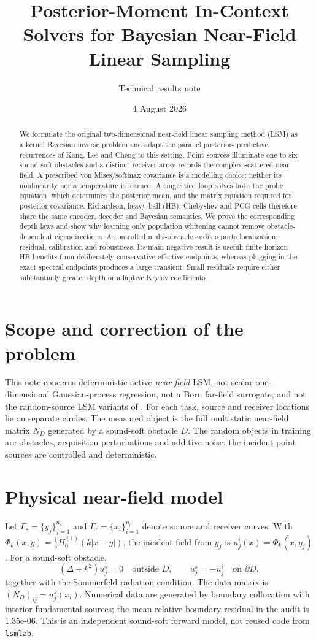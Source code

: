 \documentclass[10pt]{article}
\title{Posterior-Moment In-Context Solvers for Bayesian Near-Field Linear Sampling}
\author{Technical results note}
\date{4 August 2026}
\begin{document}
\maketitle

\begin{abstract}
We formulate the original two-dimensional near-field linear sampling method
(LSM) as a kernel Bayesian inverse problem and adapt the parallel posterior-
predictive recurrences of Kang, Lee and Cheng to this setting.  Point sources
illuminate one to six sound-soft obstacles and a distinct receiver array records
the complex scattered near field.  A prescribed von Mises/softmax covariance is
a modelling choice: neither its nonlinearity nor a temperature is learned.  A
single tied loop solves both the probe equation, which determines the posterior
mean, and the matrix equation required for posterior covariance.  Richardson,
heavy-ball (HB), Chebyshev and PCG cells therefore share the same encoder,
decoder and Bayesian semantics.  We prove the corresponding depth laws and
show why learning only population whitening cannot remove obstacle-dependent
eigendirections.  A controlled multi-obstacle audit reports localization,
residual, calibration and robustness.  Its main negative result is useful:
finite-horizon HB benefits from deliberately conservative effective endpoints,
whereas plugging in the exact spectral endpoints produces a large transient.
Small residuals require either substantially greater depth or adaptive Krylov
coefficients.
\end{abstract}

\section{Scope and correction of the problem}
This note concerns deterministic active \emph{near-field} LSM, not scalar
one-dimensional Gaussian-process regression, not a Born far-field surrogate,
and not the random-source LSM variants of \citet{montanelli2022,montanelli2024}.
For each task, source and receiver locations lie on separate circles.  The
measured object is the full multistatic near-field matrix $N_D$ generated by a
sound-soft obstacle $D$.  The random objects in training are obstacles,
acquisition perturbations and additive noise; the incident point sources are
controlled and deterministic.

\section{Physical near-field model}
Let $\Gamma_s=\{y_j\}_{j=1}^{n_s}$ and
$\Gamma_r=\{x_i\}_{i=1}^{n_r}$ denote source and receiver curves.  With
$\Phi_k(x,y)=\tfrac{\mathrm i}{4}H_0^{(1)}(k|x-y|)$, the incident field
from $y_j$ is $u_j^i(x)=\Phi_k(x,y_j)$.  For a sound-soft obstacle,
\[
 (\Delta+k^2)u_j^s=0\quad\text{outside }D,
 \qquad u_j^s=-u_j^i\quad\text{on }\partial D,
\]
together with the Sommerfeld radiation condition.  The data matrix is
$(N_D)_{ij}=u_j^s(x_i)$.  Numerical data are generated by boundary
collocation with interior fundamental sources; the mean relative boundary
residual in the audit is 1.35e-06.  This is an independent sound-soft
forward model, not reused code from \texttt{lsmlab}.
\end{document}

